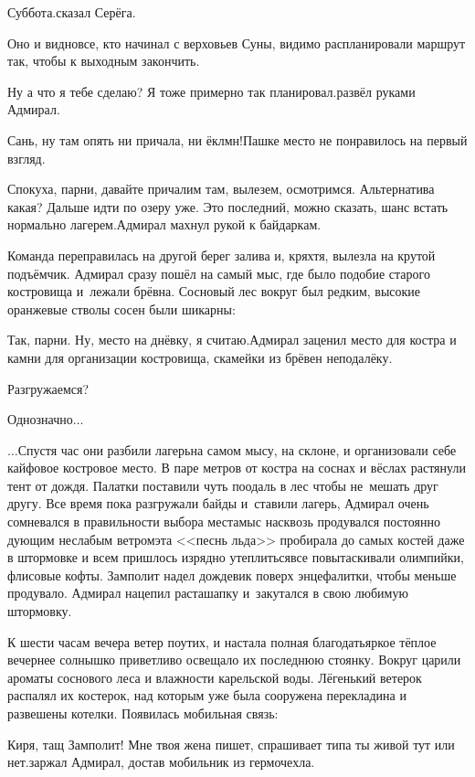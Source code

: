 \diagdash Суббота.\mdash сказал Серёга.

\diagdash Оно и видно\mdash все, кто начинал с верховьев Суны, видимо распланировали маршрут так, чтобы к выходным закончить.

\diagdash Ну а что я тебе сделаю? Я тоже примерно так планировал.\mdash развёл руками Адмирал.

\diagdash Сань, ну там опять ни причала, ни ёклмн!\mdash Пашке место не понравилось на первый взгляд.

\diagdash Спокуха, парни, давайте причалим там, вылезем, осмотримся. Альтернатива какая? Дальше идти по озеру уже. Это последний, можно сказать, шанс встать нормально лагерем.\mdash Адмирал махнул рукой к байдаркам.

Команда переправилась на другой берег залива и, кряхтя, вылезла на крутой подъёмчик. Адмирал сразу пошёл на самый мыс, где было подобие старого костровища и~лежали брёвна. Сосновый лес вокруг был редким, высокие оранжевые стволы сосен были шикарны:

\diagdash Так, парни. Ну, место на днёвку, я считаю.\mdash Адмирал заценил место для костра и камни для организации костровища, скамейки из брёвен неподалёку.

\diagdash Разгружаемся?

\diagdash Однозначно$\ldots$

\vspace{0.5cm}
$\ldots$Спустя час они разбили лагерь\mdash на самом мысу, на склоне, и организовали себе кайфовое костровое место. В паре метров от костра на соснах и вёслах растянули тент от дождя. Палатки поставили чуть поодаль в лес чтобы не~мешать друг другу. Все время пока разгружали байды и~ставили лагерь, Адмирал очень сомневался в правильности выбора места\mdash мыс насквозь продувался постоянно дующим неслабым ветром\mdash эта <<песнь льда>> пробирала до самых костей даже в штормовке и всем пришлось изрядно утеплиться\mdash все повытаскивали олимпийки, флисовые кофты. Замполит надел дождевик поверх энцефалитки, чтобы меньше продувало. Адмирал нацепил раста\sdash шапку и~закутался в свою любимую штормовку.

К шести часам вечера ветер поутих, и настала полная благодать\mdash яркое тёплое вечернее солнышко приветливо освещало их последнюю стоянку. Вокруг царили ароматы соснового леса и влажности карельской воды. Лёгенький ветерок распалял их костерок, над которым уже была сооружена перекладина и развешены котелки. Появилась мобильная связь:

\diagdash Киря, тащ Замполит! Мне твоя жена пишет, спрашивает типа ты живой тут или нет.\mdash заржал Адмирал, достав мобильник из гермочехла.

